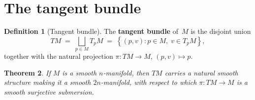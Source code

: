 \documentclass[12pt,a4paper,openany]{book}
\newtheorem{theorem}{Theorem}[section]
\theoremstyle{definition}
\newtheorem{definition}[theorem]{Definition}
\theoremstyle{remark}
\newcommand{\set}[1]{\left\{ #1 \right\}}
\begin{document}
\section{The tangent bundle}\label{sec:tangent-bundle}

\begin{definition}[Tangent bundle]\label{def:tangent-bundle}%
The \textbf{tangent bundle} of~$M$ is the disjoint union
\[
  TM \;=\; \bigsqcup_{p \in M} T_pM
  \;=\; \set{(p, v) : p \in M,\; v \in T_pM},
\]
together with the natural projection
$\pi \colon TM \to M$, $(p, v) \mapsto p$.
\end{definition}

\begin{theorem}\label{thm:TM-manifold}%
If $M$ is a smooth $n$-manifold, then $TM$ carries a natural smooth
structure making it a smooth $2n$-manifold, with respect to which
$\pi \colon TM \to M$ is a smooth surjective submersion.
\end{theorem}
\end{document}
